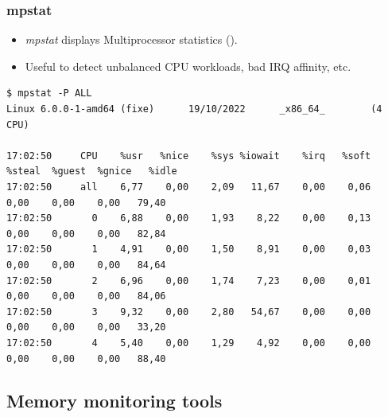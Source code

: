 \begin{frame}[fragile]
  \frametitle{mpstat}
  \begin{itemize}
    \item {\em mpstat} displays Multiprocessor statistics ().
    \item Useful to detect unbalanced CPU workloads, bad IRQ affinity, etc.
  \end{itemize}
  \begin{block}{}
    \begin{verbatim}
$ mpstat -P ALL
Linux 6.0.0-1-amd64 (fixe)      19/10/2022      _x86_64_        (4 CPU)

17:02:50     CPU    %usr   %nice    %sys %iowait    %irq   %soft  %steal  %guest  %gnice   %idle
17:02:50     all    6,77    0,00    2,09   11,67    0,00    0,06    0,00    0,00    0,00   79,40
17:02:50       0    6,88    0,00    1,93    8,22    0,00    0,13    0,00    0,00    0,00   82,84
17:02:50       1    4,91    0,00    1,50    8,91    0,00    0,03    0,00    0,00    0,00   84,64
17:02:50       2    6,96    0,00    1,74    7,23    0,00    0,01    0,00    0,00    0,00   84,06
17:02:50       3    9,32    0,00    2,80   54,67    0,00    0,00    0,00    0,00    0,00   33,20
17:02:50       4    5,40    0,00    1,29    4,92    0,00    0,00    0,00    0,00    0,00   88,40
    \end{verbatim}
  \end{block}
\end{frame}

\subsection{Memory monitoring tools}

